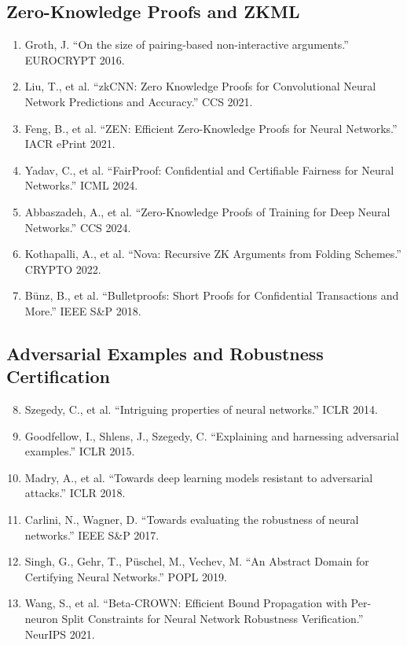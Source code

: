\documentclass[11pt,a4paper]{article}
\begin{document}
\subsection*{Zero-Knowledge Proofs and ZKML}

\begin{enumerate}
    \item Groth, J. ``On the size of pairing-based non-interactive arguments.'' EUROCRYPT 2016.

    \item Liu, T., et al. ``zkCNN: Zero Knowledge Proofs for Convolutional Neural Network Predictions and Accuracy.'' CCS 2021.

    \item Feng, B., et al. ``ZEN: Efficient Zero-Knowledge Proofs for Neural Networks.'' IACR ePrint 2021.

    \item Yadav, C., et al. ``FairProof: Confidential and Certifiable Fairness for Neural Networks.'' ICML 2024.

    \item Abbaszadeh, A., et al. ``Zero-Knowledge Proofs of Training for Deep Neural Networks.'' CCS 2024.

    \item Kothapalli, A., et al. ``Nova: Recursive ZK Arguments from Folding Schemes.'' CRYPTO 2022.

    \item B{\"u}nz, B., et al. ``Bulletproofs: Short Proofs for Confidential Transactions and More.'' IEEE S\&P 2018.
\end{enumerate}

\subsection*{Adversarial Examples and Robustness Certification}

\begin{enumerate}
\setcounter{enumi}{7}
    \item Szegedy, C., et al. ``Intriguing properties of neural networks.'' ICLR 2014.

    \item Goodfellow, I., Shlens, J., Szegedy, C. ``Explaining and harnessing adversarial examples.'' ICLR 2015.

    \item Madry, A., et al. ``Towards deep learning models resistant to adversarial attacks.'' ICLR 2018.

    \item Carlini, N., Wagner, D. ``Towards evaluating the robustness of neural networks.'' IEEE S\&P 2017.

    \item Singh, G., Gehr, T., P{\"u}schel, M., Vechev, M. ``An Abstract Domain for Certifying Neural Networks.'' POPL 2019.

    \item Wang, S., et al. ``Beta-CROWN: Efficient Bound Propagation with Per-neuron Split Constraints for Neural Network Robustness Verification.'' NeurIPS 2021.
\end{enumerate}
\end{document}
